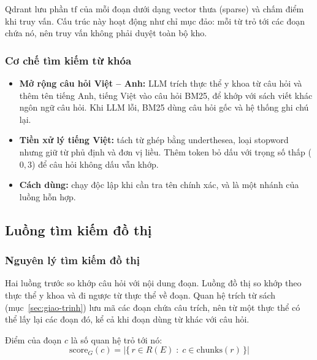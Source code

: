 Qdrant lưu phần $\mathrm{tf}$ của mỗi đoạn dưới dạng vector thưa (sparse) và chấm điểm khi truy vấn. Cấu trúc này hoạt động như chỉ mục đảo: mỗi từ trỏ tới các đoạn chứa nó, nên truy vấn không phải duyệt toàn bộ kho.

\subsubsection{Cơ chế tìm kiếm từ khóa}

\begin{itemize}
  \item \textbf{Mở rộng câu hỏi Việt -- Anh:} LLM trích thực thể y khoa từ câu hỏi và thêm tên tiếng Anh, tiếng Việt vào câu hỏi BM25, để khớp với sách viết khác ngôn ngữ câu hỏi. Khi LLM lỗi, BM25 dùng câu hỏi gốc và hệ thống ghi chú lại.
  \item \textbf{Tiền xử lý tiếng Việt:} tách từ ghép bằng underthesea, loại stopword nhưng giữ từ phủ định và đơn vị liều. Thêm token bỏ dấu với trọng số thấp ($0{,}3$) để câu hỏi không dấu vẫn khớp.
  \item \textbf{Cách dùng:} chạy độc lập khi cần tra tên chính xác, và là một nhánh của luồng hỗn hợp.
\end{itemize}


\subsection{Luồng tìm kiếm đồ thị}
\label{sec:luong-do-thi}

\subsubsection{Nguyên lý tìm kiếm đồ thị}

Hai luồng trước so khớp câu hỏi với nội dung đoạn. Luồng đồ thị so khớp theo thực thể y khoa và đi ngược từ thực thể về đoạn. Quan hệ trích từ sách (mục~\ref{sec:giao-trinh}) lưu mã các đoạn chứa câu trích, nên từ một thực thể có thể lấy lại các đoạn đó, kể cả khi đoạn dùng từ khác với câu hỏi.

Điểm của đoạn $c$ là số quan hệ trỏ tới nó:
\begin{equation}
  \mathrm{score}_{G}(c)=\bigl|\{\,r\in R(E)\;:\;c\in \mathrm{chunks}(r)\,\}\bigr|
\end{equation}

